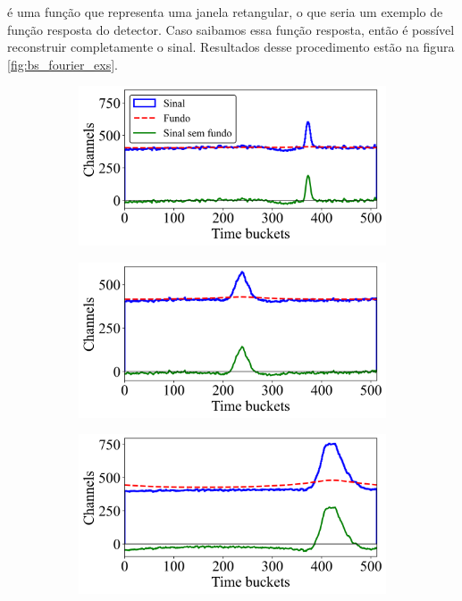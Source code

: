 \documentclass[a4paper,12pt,oneside]{book}
\begin{document}
é uma função que representa uma janela retangular, o que seria um exemplo de função resposta do detector. Caso saibamos essa função resposta, então é possível reconstruir completamente o sinal. Resultados desse procedimento estão na figura \ref{fig:bs_fourier_exs}.

\begin{figure}[H]
\centering
    \begin{subfigure}[c]{0.45\textwidth}
        \includegraphics[scale=0.45]{figs/bs_fourier_1.png}
        \caption{}
        \label{subfig:bs_fourier_1}
    \end{subfigure}%
    \hfill
    \begin{subfigure}[c]{0.45\textwidth}
        \includegraphics[scale=0.45]{figs/bs_fourier_2.png}
        \caption{}
        \label{subfig:bs_fourier_2}
    \end{subfigure}
    \begin{subfigure}[b]{0.45\textwidth}
        \centering
        \includegraphics[scale=0.45]{figs/bs_fourier_3.png}

\end{subfigure}
\end{figure}
\end{document}
